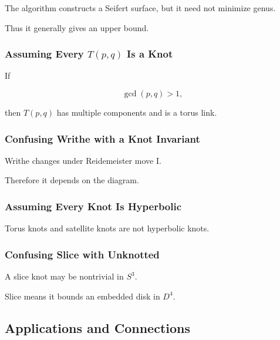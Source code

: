 The algorithm constructs a Seifert surface, but it need not minimize genus.

Thus it generally gives an upper bound.

\subsubsection{Assuming Every \texorpdfstring{\(T(p,q)\)}{T(p,q)} Is a Knot}

If

\[
\gcd(p,q)>1,
\]

then \(T(p,q)\) has multiple components and is a torus link.

\subsubsection{Confusing Writhe with a Knot Invariant}

Writhe changes under Reidemeister move I.

Therefore it depends on the diagram.

\subsubsection{Assuming Every Knot Is Hyperbolic}

Torus knots and satellite knots are not hyperbolic knots.

\subsubsection{Confusing Slice with Unknotted}

A slice knot may be nontrivial in \(S^3\).

Slice means it bounds an embedded disk in \(D^4\).

\subsection{Applications and Connections}
\label{subsec:knot-theory-applications}

